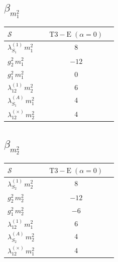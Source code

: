 \documentclass[9pt]{article}
\begin{document}
\subsection*{$ \beta_{m_1^{2}} $}
\begin{longtable}{@{}p{0.31\linewidth}c@{}}
\toprule
$\mathcal{S}$ & $ \mathrm{T3-E}\;(\alpha=0) $ \\
\midrule
$ \lambda_{S_1}^{(1)}\,m_1^{2} $ & $ 8 $ \\
$ g_2^2\,m_1^{2} $ & $ -12 $ \\
$ g_1^2\,m_1^{2} $ & $ 0 $ \\
$ \lambda_{12}^{(1)}\,m_2^{2} $ & $ 6 $ \\
$ \lambda_{S_1}^{(A)}\,m_1^{2} $ & $ 4 $ \\
$ \lambda_{12}^{(\times)}\,m_2^{2} $ & $ 4 $ \\
\bottomrule
\end{longtable}
\subsection*{$ \beta_{m_2^{2}} $}
\begin{longtable}{@{}p{0.31\linewidth}c@{}}
\toprule
$\mathcal{S}$ & $ \mathrm{T3-E}\;(\alpha=0) $ \\
\midrule
$ \lambda_{S_2}^{(1)}\,m_2^{2} $ & $ 8 $ \\
$ g_2^2\,m_2^{2} $ & $ -12 $ \\
$ g_1^2\,m_2^{2} $ & $ -6 $ \\
$ \lambda_{12}^{(1)}\,m_1^{2} $ & $ 6 $ \\
$ \lambda_{S_2}^{(A)}\,m_2^{2} $ & $ 4 $ \\
$ \lambda_{12}^{(\times)}\,m_1^{2} $ & $ 4 $ \\
\bottomrule
\end{longtable}
\end{document}
